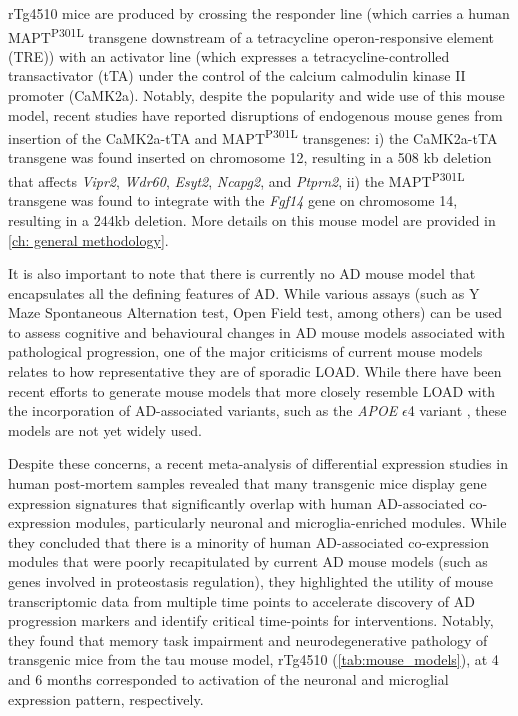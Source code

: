 rTg4510 mice are produced by crossing the responder line (which carries a human MAPT\textsuperscript{P301L} transgene downstream of a tetracycline operon-responsive element (TRE)) with an activator line (which expresses a tetracycline-controlled transactivator (tTA) under the control of the calcium calmodulin kinase II promoter (CaMK2a). Notably, despite the popularity and wide use of this mouse model, recent studies have reported disruptions of endogenous mouse genes from insertion of the CaMK2a-tTA and MAPT\textsuperscript{P301L} transgenes\cite{Gamache2019}: i) the CaMK2a-tTA transgene was found inserted on chromosome 12, resulting in a 508 kb deletion that affects \textit{Vipr2}, \textit{Wdr60}, \textit{Esyt2}, \textit{Ncapg2}, and \textit{Ptprn2}, ii) the MAPT\textsuperscript{P301L} transgene was found to integrate with the \textit{Fgf14} gene on chromosome 14, resulting in a 244kb deletion. More details on this mouse model are provided in \cref{ch: general methodology}. 

It is also important to note that there is currently no AD mouse model that encapsulates all the defining features of AD. While various assays (such as Y Maze Spontaneous Alternation test, Open Field test, among others) can be used to assess cognitive and behavioural changes in AD mouse models associated with pathological progression\cite{Blackmore2017}, one of the major criticisms of current mouse models relates to how representative they are of sporadic LOAD. While there have been recent efforts to generate mouse models that more closely resemble LOAD with the incorporation of AD-associated variants, such as the \textit{APOE} $\epsilon$4 variant \cite{apoe4trem2_mousemodel,Lewandowski2020}, these models are not yet widely used. 

Despite these concerns, a recent meta-analysis of differential expression studies in human post-mortem samples revealed that many transgenic mice display gene expression signatures that significantly overlap with human AD-associated co-expression modules, particularly neuronal and microglia-enriched modules\cite{Wan2020}. While they concluded that there is a minority of human AD-associated co-expression modules that were poorly recapitulated by current AD mouse models (such as genes involved in proteostasis regulation), they highlighted the utility of mouse transcriptomic data from multiple time points to accelerate discovery of AD progression markers and identify critical time-points for interventions. Notably, they found that memory task impairment and neurodegenerative pathology of transgenic mice from the tau mouse model, rTg4510 (\cref{tab:mouse_models}), at 4 and 6 months corresponded to activation of the neuronal and microglial expression pattern, respectively. 

